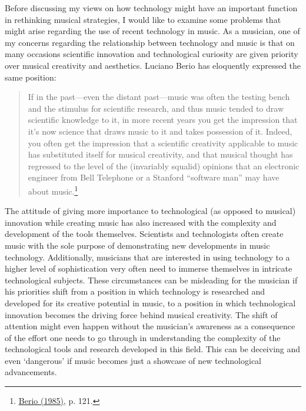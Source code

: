 Before discussing my views on how technology might have an important function in rethinking musical strategies, I would like to examine some problems that might arise regarding the use of recent technology in music. As a musician, one of my concerns regarding the relationship between technology and music is that on many occasions scientific innovation and technological curiosity are given priority over musical creativity and aesthetics. Luciano Berio has eloquently expressed the same position:
\begin{quote}
If in the past---even the distant past---music was often the testing bench and the stimulus for scientific research, and thus music tended to draw scientific knowledge to it, in more recent years you get the impression that it's now science that draws music to it and takes possession of it. Indeed, you often get the impression that a scientific creativity applicable to music has substituted itself for musical creativity, and that musical thought has regressed to the level of the (invariably squalid) opinions that an electronic engineer from Bell Telephone or a Stanford ``software man'' may have about music.\footnote{\hyperlink{berio}{Berio (1985)}, p. 121.} 
\end{quote}
The attitude of giving more importance to technological (as opposed to musical) innovation while creating music has also increased with the complexity and development of the tools themselves. Scientists and technologists often create music with the sole purpose of demonstrating new developments in music technology. Additionally, musicians that are interested in using technology to a higher level of sophistication very often need to immerse themselves in intricate technological subjects. These circumstances can be misleading for the musician if his priorities shift from a position in which technology is researched and developed for its creative potential in music, to a position in which technological innovation becomes the driving force behind musical creativity.  The shift of attention might even happen without the musician's awareness as a consequence of the effort one needs to go through in understanding the complexity of the technological tools and research developed in this field. This can be deceiving and even `dangerous' if music becomes just a showcase of new technological advancements. 

